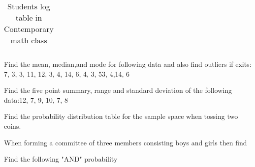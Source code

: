 \documentclass[11pt]{exam}
\begin{document}
\begin{questions}
\begin{table}[h]
\begin{tabular}{|c|c|c|}
	\end{tabular}
	\caption{Students log table in Contemporary math class}
	\label{tab:msg1}                            
	
\end{table}
\vspace{10cm}



\addpoints
\question[5] Find the mean, median,and mode for following data and also find outliers if exits: 7, 3, 3, 11, 12, 3, 4, 14, 6, 4, 3, 53, 4,14, 6 

\vspace{3cm}

\question[8] Find the five point summary, range and standard deviation of the following data:12, 7, 9, 10, 7, 8

\newpage
\addpoints
\question[3] Find the probability distribution table for the sample space when tossing two coins.



\vspace{9cm}
\addpoints
\question[6]  When forming a committee of three members consisting boys and girls then find 
\vspace{2cm}

\question[6] Find the following "AND" probability
\end{questions}
\end{document}
